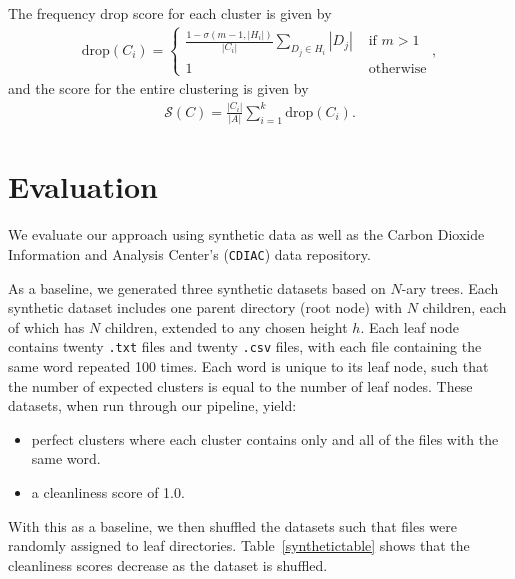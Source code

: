 \documentclass[sigconf,screen]{acmart}
\newcommand{\bee}{\begin{equation}\begin{aligned}}              %
\newcommand{\eee}{\end{aligned}\end{equation}}                  %
\newcommand{\fracc}{\frac}                                      %
\begin{document}
\noindent
The frequency drop score for each cluster is given by
\bee
\mathrm{drop}(C_i) = 
\begin{cases}
\fracc{1 - \sigma(m - 1, |H_i|)}{|C_i|}\sum\limits_{D_j \in H_i}|D_j| & \text{ if }m > 1\\
1 & \text{ otherwise}
\end{cases}, 
\eee
and the score for the entire clustering is given by
\bee
\mathcal{S}(C) = \fracc{|C_i|}{|A|}\sum_{i = 1}^k \mathrm{drop}(C_i). 
\eee


\section{Evaluation}
We evaluate our approach using synthetic data as well as the Carbon Dioxide Information and Analysis Center's (\texttt{CDIAC}) data repository. 

As a baseline, we generated three synthetic datasets based on $N$-ary trees. Each synthetic dataset includes one parent directory (root node) with $N$ children, each of which has $N$ children, extended to any chosen height $h$. Each leaf node contains twenty \texttt{.txt} files and twenty \texttt{.csv} files, with each file containing the same word repeated 100 times. Each word is unique to its leaf node, such that the number of expected clusters is equal to the number of leaf nodes. These datasets, when run through our pipeline, yield:
\begin{itemize}
    \item perfect clusters where each cluster contains only and all of the files with the same word.
    \item a cleanliness score of 1.0.
\end{itemize} 
With this as a baseline, we then shuffled the datasets such that files were randomly assigned to leaf directories. Table~\ref{synthetictable} shows that the cleanliness scores decrease as the dataset is shuffled.

\end{document}

